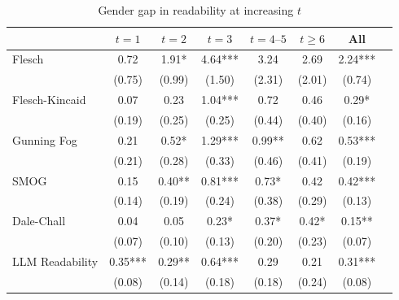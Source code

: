 \begin{table}
    \footnotesize
    \centering
    \begin{threeparttable}
        \caption{Gender gap in readability at increasing \(t\)}
        \label{tableH2_FemRatio}
        \begin{tabular}{p{3cm}S@{}S@{}S@{}S@{}S@{}S@{}S@{}}
            \toprule
            &{\(t=1\)}&{\(t=2\)}&{\(t=3\)}&{\(t=4\text{--}5\)}&{\(t\ge6\)}&{All}\\
            \midrule
            Flesch                        &        0.72   &        1.91*  &        4.64***&        3.24   &        2.69   &        2.24***\\
                                          &      (0.75)   &      (0.99)   &      (1.50)   &      (2.31)   &      (2.01)   &      (0.74)   \\
            Flesch-Kincaid                &        0.07   &        0.23   &        1.04***&        0.72   &        0.46   &        0.29*  \\
                                          &      (0.19)   &      (0.25)   &      (0.25)   &      (0.44)   &      (0.40)   &      (0.16)   \\
            Gunning Fog                   &        0.21   &        0.52*  &        1.29***&        0.99** &        0.62   &        0.53***\\
                                          &      (0.21)   &      (0.28)   &      (0.33)   &      (0.46)   &      (0.41)   &      (0.19)   \\
            SMOG                          &        0.15   &        0.40** &        0.81***&        0.73*  &        0.42   &        0.42***\\
                                          &      (0.14)   &      (0.19)   &      (0.24)   &      (0.38)   &      (0.29)   &      (0.13)   \\
            Dale-Chall                    &        0.04   &        0.05   &        0.23*  &        0.37*  &        0.42*  &        0.15** \\
                                          &      (0.07)   &      (0.10)   &      (0.13)   &      (0.20)   &      (0.23)   &      (0.07)   \\
            LLM Readability               &        0.35***&        0.29** &        0.64***&        0.29   &        0.21   &        0.31***\\
                                          &      (0.08)   &      (0.14)   &      (0.18)   &      (0.18)   &      (0.24)   &      (0.08)   \\

\end{tabular}
\end{threeparttable}
\end{table}
